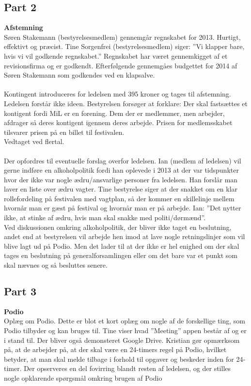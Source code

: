 \subsection{Part 2}
\label{ws2}
\noindent \textbf{Afstemning} \\
Søren Stakemann (bestyrelsesmedlem) gennemgår regnskabet for 2013. Hurtigt, effektivt og præcist. Tine Sorgenfrei (bestyrelsesmedlem) siger: ”Vi klapper bare, hvis vi vil godkende regnskabet.” Regnskabet har været gennemkigget af et revisionsfirma og er godkendt. Efterfølgende  gennemgåes budgettet for 2014 af Søren Stakemann som godkendes ved en klapsalve.
\\ \\
Kontingent introduceres for ledelsen med 395 kroner og tages til afstemning. Ledelsen forstår ikke ideen. Bestyrelsen forsøger at forklare: Der skal fastsættes et kontigent fordi MiL er en forening. Dem der er medlemmer, men arbejder, afdrager så deres kontigent igennem deres arbejde. Prisen for medlemsskabet tilsvarer prisen på en billet til festivalen. \\ Vedtaget ved flertal.
\\ \\
Der opfordres til eventuelle forslag overfor ledelsen. Ian (medlem af ledelsen) vil gerne indføre en alkoholpolitik fordi han oplevede i 2013 at der var tidspunkter hvor der ikke var nogle ædru/ansvarlige personer fra ledelsen. Han forslår man laver en liste over ædru vagter.
Tine bestyrelse siger at der snakket om en klar rollefordeling på festivalen med vagtplan, så der kommer en skillelinje mellem hvornår man er gæst på festival og hvornår man er på arbejde.
Ian: ”Det nytter ikke, at stinke af ædru, hvis man skal snakke med politi/dørmænd”. 
\\
Ved diskussionen omkring alkoholpolitik, der bliver ikke taget en beslutning, andet end at bestyrelsen vil arbejde hen imod at lave nogle retningslinjer som vil blive lagt ud på Podio. Men det lader til at der ikke er hel enighed om der skal tages en beslutning på generalforsamlingen eller om det bare var et punkt som skal nævnes og så besluttes senere.

\subsection{Part 3}
\label{ws3}
\noindent \textbf{Podio} \\
Oplæg om Podio. Dette er blot et kort oplæg om nogle af de forskellige ting, som Podio tilbyder og kan bruges til. Tine viser hvad ”Meeting” appen består af og er i stand til. Der bliver også demonsteret Google Drive. Kristian gør opmærksom på, at de arbejder på, at der skal være en 24-timers regel på Podio, hvilket betyder, at man skal melde tilbage i forhold til opgaver og beskeder inden for 24-timer. Der opserveres en del fovirring blandt resten af ledelsen, og der stilles nogle opklarende spørgsmål omkring brugen af Podio

